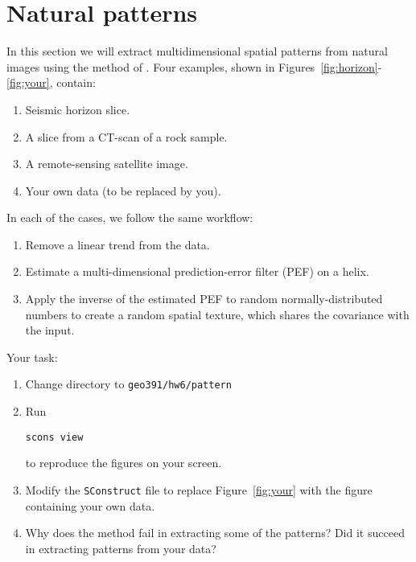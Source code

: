
\lstset{language=python,numbers=left,numberstyle=\tiny,showstringspaces=false}



\section{Natural patterns}

In this section we will extract multidimensional spatial patterns from
natural images using the method of \cite{textures}. Four examples,
shown in Figures~\ref{fig:horizon}-\ref{fig:your}, contain:
\begin{enumerate}
\item Seismic horizon slice.
\item A slice from a CT-scan of a rock sample.
\item A remote-sensing satellite image.
\item Your own data (to be replaced by you).
\end{enumerate}
In each of the cases, we follow the same workflow:
\begin{enumerate}
\item Remove a linear trend from the data.
\item Estimate a multi-dimensional prediction-error filter (PEF) on a helix.
\item Apply the inverse of the estimated PEF to random normally-distributed numbers
  to create a random spatial texture, which shares the covariance with the input. 
\end{enumerate}


\lstset{language=python,numbers=left,numberstyle=\tiny,showstringspaces=false}


Your task:
\begin{enumerate}
\item Change directory to \verb#geo391/hw6/pattern#
\item Run 
\begin{verbatim}
scons view
\end{verbatim}
to reproduce the figures on your screen.
\item Modify the \texttt{SConstruct} file to replace Figure~\ref{fig:your} with the figure containing your own data.
\item Why does the method fail in extracting some of the patterns? Did it succeed in extracting patterns from your data?
\end{enumerate}

